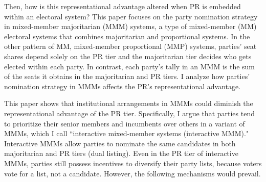 \documentclass[a4paper, 11pt]{article}
\begin{document}
Then, how is this representational advantage altered when PR is embedded within an electoral system? This paper focuses on the party nomination strategy in mixed-member majoritarian (MMM) systems, a type of mixed-member (MM) electoral systems \citep{shugartMixedmemberElectoralSystems2003} that combines majoritarian and proportional systems.\footnotemark{} In the other pattern of MM, mixed-member proportional  (MMP) systems, parties' seat shares depend solely on the PR tier and the majoritarian tier decides who gets elected within each party. In contrast, each party's tally in an MMM is the sum of the seats it obtains in the majoritarian and PR tiers. I analyze how parties' nomination strategy in MMMs affects the PR's representational advantage.


This paper shows that institutional arrangements in MMMs could diminish the representational advantage of the PR tier. Specifically, I argue that parties tend to prioritize their senior members and incumbents over others in a variant of MMMs, which I call ``interactive mixed-member systems (interactive MMM)."\footnotemark{} Interactive MMMs allow parties to nominate the same candidates in both majoritarian and PR tiers (dual listing). Even in the PR tier of interactive MMMs, parties still possess incentives to diversify their party lists, because voters vote for a list, not a candidate. However, the following mechanisms would prevail. 

\end{document}
